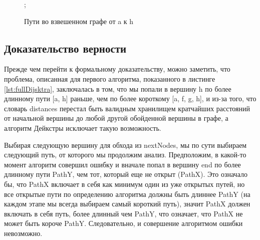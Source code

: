 \documentclass[../../article.tex]{subfiles}
\begin{document}
\begin{figure}
\begin{styledtikz}

        ;
    \end{styledtikz}
    \caption{Пути во взвешенном графе от {\firacodebold a} к {\firacodebold h}}
    \label{fig:dijkstraProve}
\end{figure}

\subsection{Доказательство верности} \label{dijkstraProve}

Прежде чем перейти к формальному доказательству, можно заметить, что проблема, описанная для первого алгоритма, показанного в листинге \ref{lst:fullDijsktra}, заключалась в том, что мы попали в вершину h по более длинному пути [a, h] раньше, чем по более короткому [a, f, g, h], и из-за того, что словарь distances перестал быть валидным хранилищем кратчайших расстояний от начальной вершины до любой другой обойденной вершины в графе, а алгоритм Дейкстры исключает такую возможность.

Выбирая следующую вершину для обхода из nextNodes, мы по сути выбираем следующий путь, от которого мы продолжим анализ. Предположим, в какой-то момент алгоритм совершил ошибку и вначале попал в вершину end по более длинному пути PathY, чем тот, который еще не открыт (PathX). Это означало бы, что PathX включает в себя как минимум один из уже открытых путей, но все открытые пути по определению алгоритма должны быть длиннее PathY (на каждом этапе мы всегда выбираем самый короткий путь), значит PathX должен включать в себя путь, более длинный чем PathY, что означает, что PathX не может быть короче PathY. Следовательно, и совершение алгоритмом ошибки невозможно.
\end{document}
